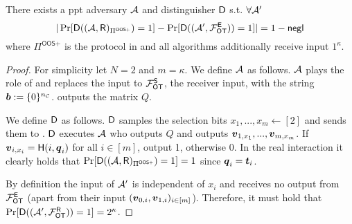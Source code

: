\label{proof:Attack_AllOnes}
\begin{lemma} \label{lem:malSend}
	There exists a ppt adversary $\mathcal{A}$ and distinguisher $\mathsf D$ s.t. $\forall\mathcal{A}'$ 
	$$
	|\Pr[\mathsf D((\mathcal{A}, \mathsf{R})_{\Pi^{\textsf{OOS+}}})=1]-\Pr[\mathsf D((\mathcal{A}', \mathcal{F}_{\mathsf{OT}}^{\mathsf{E}}))=1]|=1-\mathsf{negl}
	$$
	where $\Pi^{\textsf{OOS+}}$ is the protocol in  and all algorithms additionally receive input $1^\kappa$. 
\end{lemma}

\begin{proof} 
	For simplicity let $N=2$ and $m=\kappa$. We define $\mathcal{A}$ as follows. $\mathcal{A}$ plays the role of \send and replaces the input to $\mathcal{F}_{\mathsf{OT}}^\mathsf{S}$, the receiver input, with the string $\boldsymbol{b}:=\{0\}^{{n_\mathcal{C}}}$. \Adv outputs the matrix $Q$.
	
	We define $\mathsf D$ as follows. $\mathsf D$ samples the selection bits $x_1,...,x_m\gets[2]$ and sends them to \rec. $\mathsf D$ executes $\mathcal{A}$ who outputs $Q$ and \rec outputs $\boldsymbol{v}_{1,x_1},...,\boldsymbol{v}_{m,x_m}$. If $\boldsymbol{v}_{i,x_i}=\mathsf{H}(i,\boldsymbol{q}_i)$ for all $i\in[m]$, output 1, otherwise 0. In the real interaction it clearly holds that $\Pr[\mathsf D((\mathcal{A}, \mathsf{R})_{\Pi^{\textsf{OOS+}}})=1]=1$ since $\boldsymbol{q}_i=\boldsymbol{t}_i$.
	
	By definition the input of $\mathcal{A}'$ is independent of $x_i$ and receives no output from $\mathcal{F}_{\mathsf{OT}}^\mathsf{E}$ (apart from their input $(\boldsymbol{v}_{0,i},\boldsymbol{v}_{1,i})_{i\in [m]}$). Therefore, it must hold that $\Pr[\mathsf D((\mathcal{A}', \mathcal{F}_{\mathsf{OT}}^\mathsf{R}))=1]=2^{\kappa}$.
	\pe
\end{proof}
